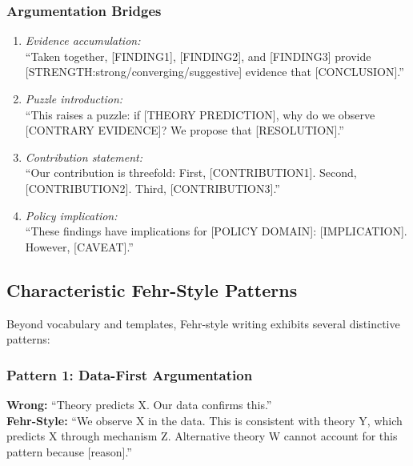 \subsubsection{Argumentation Bridges}

\begin{enumerate}[label=\textbf{B\arabic*.}, leftmargin=2.5cm]
\item \textit{Evidence accumulation:} \\
``Taken together, [FINDING1], [FINDING2], and [FINDING3] provide
[STRENGTH:strong/converging/suggestive] evidence that [CONCLUSION].''

\item \textit{Puzzle introduction:} \\
``This raises a puzzle: if [THEORY PREDICTION], why do we observe
[CONTRARY EVIDENCE]? We propose that [RESOLUTION].''

\item \textit{Contribution statement:} \\
``Our contribution is threefold: First, [CONTRIBUTION1]. Second,
[CONTRIBUTION2]. Third, [CONTRIBUTION3].''

\item \textit{Policy implication:} \\
``These findings have implications for [POLICY DOMAIN]:
[IMPLICATION]. However, [CAVEAT].''
\end{enumerate}

\subsection{Characteristic Fehr-Style Patterns}

Beyond vocabulary and templates, Fehr-style writing exhibits several
distinctive patterns:

\subsubsection{Pattern 1: Data-First Argumentation}

\begin{tcolorbox}[colback=gray!5!white, colframe=gray!75!black]
\textbf{Wrong:} ``Theory predicts X. Our data confirms this.'' \\[0.5em]
\textbf{Fehr-Style:} ``We observe X in the data. This is consistent with
theory Y, which predicts X through mechanism Z. Alternative theory W
cannot account for this pattern because [reason].''
\end{tcolorbox}

